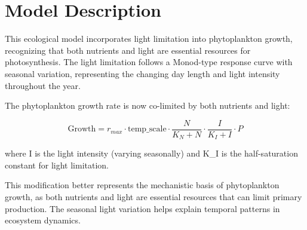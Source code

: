 \section{Model Description}

This ecological model incorporates light limitation into phytoplankton growth, recognizing that both nutrients and light are essential resources for photosynthesis. The light limitation follows a Monod-type response curve with seasonal variation, representing the changing day length and light intensity throughout the year.

The phytoplankton growth rate is now co-limited by both nutrients and light:

\[ \text{Growth} = r_{max} \cdot \text{temp\_scale} \cdot \frac{N}{K_N + N} \cdot \frac{I}{K_I + I} \cdot P \]

where I is the light intensity (varying seasonally) and K_I is the half-saturation constant for light limitation.

This modification better represents the mechanistic basis of phytoplankton growth, as both nutrients and light are essential resources that can limit primary production. The seasonal light variation helps explain temporal patterns in ecosystem dynamics.
